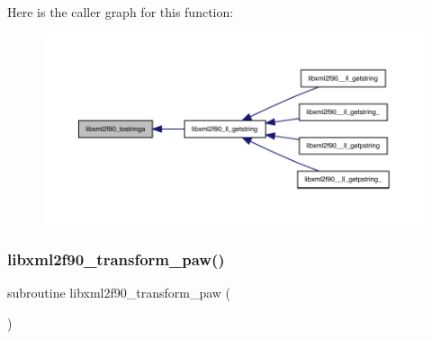 Here is the caller graph for this function\+:
\nopagebreak
\begin{figure}[H]
\begin{center}
\leavevmode
\includegraphics[width=350pt]{libxml2f90_8f90__pp_8f90_a33b51f94ad4a4b0fabdf48039bd6a849_icgraph}
\end{center}
\end{figure}
\mbox{\label{libxml2f90_8f90__pp_8f90_abf51b9d401b7210767c8a771a9ba2cf4}} 
\subsubsection{\texorpdfstring{libxml2f90\+\_\+transform\+\_\+paw()}{libxml2f90\_transform\_paw()}}
{\footnotesize\ttfamily subroutine libxml2f90\+\_\+transform\+\_\+paw (\begin{DoxyParamCaption}{ }\end{DoxyParamCaption})}

